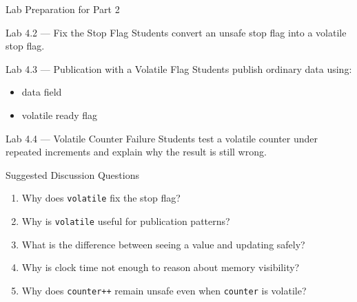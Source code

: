 \documentclass[aspectratio=169,11pt]{beamer}
\begin{document}
	\begin{frame}{Lab Preparation for Part 2}
		\begin{block}{Lab 4.2 --- Fix the Stop Flag}
			Students convert an unsafe stop flag into a volatile stop flag.
		\end{block}
		
		\vspace{0.25cm}
		
		\begin{block}{Lab 4.3 --- Publication with a Volatile Flag}
			Students publish ordinary data using:
			\begin{itemize}
				\item data field
				\item volatile ready flag
			\end{itemize}
		\end{block}
		
		\vspace{0.25cm}
		
		\begin{block}{Lab 4.4 --- Volatile Counter Failure}
			Students test a volatile counter under repeated increments and explain why the result is still wrong.
		\end{block}
	\end{frame}
	
	\begin{frame}{Suggested Discussion Questions}
		\begin{enumerate}
			\item Why does \texttt{volatile} fix the stop flag?
			\item Why is \texttt{volatile} useful for publication patterns?
			\item What is the difference between seeing a value and updating safely?
			\item Why is clock time not enough to reason about memory visibility?
			\item Why does \texttt{counter++} remain unsafe even when \texttt{counter} is volatile?
		\end{enumerate}
	\end{frame}
	
\end{document}
